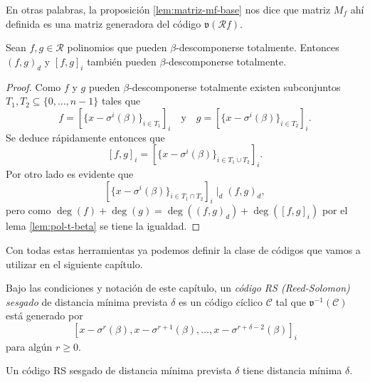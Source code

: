 En otras palabras, la proposición \ref{lem:matriz-mf-base} nos dice que matriz \(M_f\) ahí definida es una matriz generadora del código \(\mathfrak v(\mathcal R f)\).

\begin{lemma}
  \label{lem:b-descomposicion-mcm-mcd}
  Sean \(f, g \in \mathcal R\) polinomios que pueden \(\beta\)-descomponerse totalmente.
  Entonces \((f, g)_d\) y \([f, g]_i\) también pueden \(\beta\)-descomponerse totalmente.
\end{lemma}

\begin{proof}
  Como \(f\) y \(g\) pueden \(\beta\)-descomponerse totalmente existen subconjuntos \(T_1, T_2 \subseteq \{0, \dots, n - 1\}\) tales que 
  \[
    f = \left[\{x - \sigma^i(\beta)\}_{i \in T_1}\right]_i \quad \text{y} \quad g = \left[\{x - \sigma^i(\beta)\}_{i \in T_2}\right]_i.
  \]
  Se deduce rápidamente entonces que
  \[
    [f, g]_i = \left[\{x - \sigma^i(\beta)\}_{i \in T_1 \cup T_2}\right]_i.
  \]
  Por otro lado es evidente que 
  \[
    \left[\{x - \sigma^i(\beta)\}_{i \in T_1 \cap T_2}\right]_i \mid_d (f, g)_d,
  \]
  pero como \(\deg(f) + \deg(g) = \deg((f, g)_d) + \deg([f, g]_i)\) por el lema \ref{lem:pol-t-beta} se tiene la igualdad.
\end{proof}

Con todas estas herramientas ya podemos definir la clase de códigos que vamos a utilizar en el siguiente capítulo.

\begin{definition}
  Bajo las condiciones y notación de este capítulo, un \emph{código RS (Reed-Solomon) sesgado} de distancia mínima prevista \(\delta\) es un código cíclico \(\mathcal C\) tal que \(\mathfrak v^{-1}(\mathcal C)\) está generado por 
  \[
    \left[x - \sigma^r(\beta), x - \sigma^{r+1}(\beta), \dots, x - \sigma^{r+\delta-2}(\beta)\right]_i
  \] 
  para algún \(r \geq 0\).
\end{definition}

\begin{theorem}
  \label{th:distancia-skew-rs}
  Un código RS sesgado de distancia mínima prevista \(\delta\) tiene distancia mínima \(\delta\).
\end{theorem}

